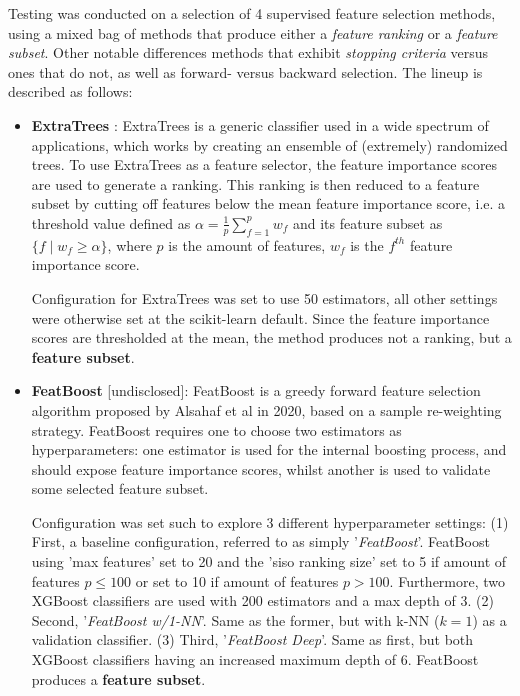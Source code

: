 \documentclass{article}
\begin{document}
Testing was conducted on a selection of 4 supervised feature selection methods, using a mixed bag of methods that produce either a \textit{feature ranking} or a \textit{feature subset}. Other notable differences methods that exhibit \textit{stopping criteria} versus ones that do not, as well as forward- versus backward selection. The lineup is described as follows:

\begin{itemize}
    \item \textbf{ExtraTrees} \citep{geurts2006extremely}: ExtraTrees is a generic classifier used in a wide spectrum of applications, which works by creating an ensemble of (extremely) randomized trees. To use ExtraTrees as a feature selector, the feature importance scores are used to generate a ranking. This ranking is then reduced to a feature subset by cutting off features below the mean feature importance score, i.e. a threshold value defined as $\alpha = \frac{1}{p}\sum^{p}_{f=1}w_f$ and its feature subset as $\{f  \mid  w_f \geq \alpha\}$, where $p$ is the amount of features, $w_f$ is the $f^{th}$ feature importance score. 
    
    Configuration for ExtraTrees was set to use 50 estimators, all other settings were otherwise set at the scikit-learn \citep{pedregosa2011scikit} default. Since the feature importance scores are thresholded at the mean, the method produces not a ranking, but a \textbf{feature subset}.
    
    \item \textbf{FeatBoost} [undisclosed]: FeatBoost is a greedy forward feature selection algorithm proposed by Alsahaf et al in 2020, based on a sample re-weighting strategy. FeatBoost requires one to choose two estimators as hyperparameters: one estimator is used for the internal boosting process, and should expose feature importance scores, whilst another is used to validate some selected feature subset.
    
    Configuration was set such to explore 3 different hyperparameter settings: (1) First, a baseline configuration, referred to as simply '\textit{FeatBoost}'. FeatBoost using 'max features' set to 20 and the 'siso ranking size' set to 5 if amount of features $p \leq 100$ or set to 10 if amount of features $p > 100$. Furthermore, two XGBoost classifiers are used with 200 estimators and a max depth of 3. (2) Second, '\textit{FeatBoost w/1-NN}'. Same as the former, but with k-NN ($k = 1$) as a validation classifier. (3) Third, '\textit{FeatBoost Deep}'. Same as first, but both XGBoost classifiers having an increased maximum depth of 6. FeatBoost produces a \textbf{feature subset}.
    

\end{itemize}
\end{document}
